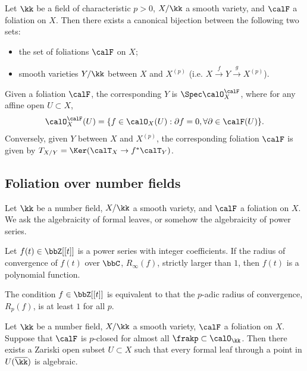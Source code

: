   \begin{theorem}
    Let $\kk$ be a field of characteristic $p > 0$, $X/\kk$ a smooth variety, and $\calF$ a foliation on $X$.
    Then there exists a canonical bijection between the following two sets:
    \begin{itemize}
      \item the set of foliations $\calF$ on $X$;
      \item smooth varieties $Y/\kk$ between $X$ and $X^{(p)}$ (i.e. $X \xrightarrow{f} Y \xrightarrow{g} X^{(p)}$).
    \end{itemize}
    Given a foliation $\calF$, the corresponding $Y$ is $\Spec \calO_X^\calF$, where for any affine open $U \subset X$,
    \[ \calO_X^\calF(U) = \{ f \in \calO_X(U) : \partial f = 0, \forall \partial \in \calF(U) \}. \]
    Conversely, given $Y$ between $X$ and $X^{(p)}$, the corresponding foliation $\calF$ is given by $T_{X/Y} = \Ker(\calT_X \to f^* \calT_Y)$.
  \end{theorem}

\subsection{Foliation over number fields}

  Let $\kk$ be a number field, $X/\kk$ a smooth variety, and $\calF$ a foliation on $X$.
  We ask the algebraicity of formal leaves, or somehow the algebraicity of power series.

  \begin{theorem}
    Let $f(t) \in \bbZ[[t]]$ is a power series with integer coefficients.
    If the radius of convergence of $f(t)$ over $\bbC$, $R_\infty(f)$, strictly larger than $1$,
    then $f(t)$ is a polynomial function. 
  \end{theorem}

  The condition $f \in \bbZ[[t]]$ is equivalent to that the $p$-adic radius of convergence, $R_p(f)$, is at least $1$ for all $p$.


  \begin{conjecture}\label{conj:algebraicity_of_leaves_by_reduction}
    Let $\kk$ be a number field, $X/\kk$ a smooth variety, $\calF$ a foliation on $X$.
    Suppose that $\calF$ is $p$-closed for almost all $\frakp \subset \calO_\kk$.
    Then there exists a Zariski open subset $U \subset X$ such that every formal leaf through a point in $U(\overline{\kk})$ is algebraic.
  \end{conjecture}

